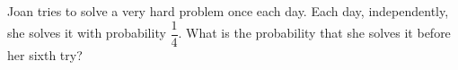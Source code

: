 Joan tries to solve a very hard problem once each day. Each day, independently, she solves it with probability $\dfrac14$. What is the probability that she solves it before her sixth try?
